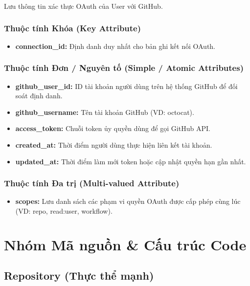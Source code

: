 Lưu thông tin xác thực OAuth của User với GitHub.

\subsubsection{Thuộc tính Khóa (Key Attribute)}

\begin{itemize}
    \item \textbf{connection\_id:} Định danh duy nhất cho bản ghi kết nối OAuth.
\end{itemize}

\subsubsection{Thuộc tính Đơn / Nguyên tố (Simple / Atomic Attributes)}

\begin{itemize}
    \item \textbf{github\_user\_id:} ID tài khoản người dùng trên hệ thống GitHub để đối soát định danh.
    \item \textbf{github\_username:} Tên tài khoản GitHub (VD: octocat).
    \item \textbf{access\_token:} Chuỗi token ủy quyền dùng để gọi GitHub API.
    \item \textbf{created\_at:} Thời điểm người dùng thực hiện liên kết tài khoản.
    \item \textbf{updated\_at:} Thời điểm làm mới token hoặc cập nhật quyền hạn gần nhất.
\end{itemize}

\subsubsection{Thuộc tính Đa trị (Multi-valued Attribute)}

\begin{itemize}
    \item \textbf{scopes:} Lưu danh sách các phạm vi quyền OAuth được cấp phép cùng lúc (VD: repo, read:user, workflow).
\end{itemize}


\section{Nhóm Mã nguồn \& Cấu trúc Code}

\subsection{Repository (Thực thể mạnh)}

